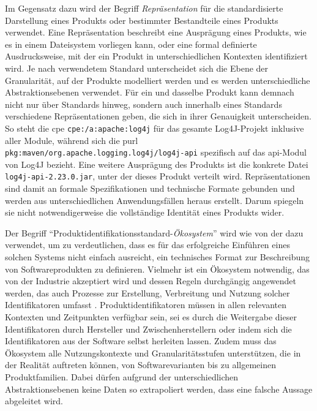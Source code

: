 Im Gegensatz dazu wird der Begriff \textit{Repräsentation} für die standardisierte Darstellung eines Produkts oder bestimmter Bestandteile eines Produkts verwendet.
Eine Repräsentation beschreibt eine Ausprägung eines Produkts, wie es in einem Dateisystem vorliegen kann, oder eine formal definierte Ausdrucksweise, mit der ein Produkt in unterschiedlichen Kontexten identifiziert wird.
Je nach verwendetem Standard unterscheidet sich die Ebene der Granularität, auf der Produkte modelliert werden und es werden unterschiedliche Abstraktionsebenen verwendet.
Für ein und dasselbe Produkt kann demnach nicht nur über Standards hinweg, sondern auch innerhalb eines Standards verschiedene Repräsentationen geben, die sich in ihrer Genauigkeit unterscheiden.
So steht die \acrshort{cpe} \texttt{cpe:/a:apache:log4j} für das gesamte Log4J-Projekt inklusive aller Module, während sich die \acrshort{purl} \texttt{pkg:maven/org.apache.logging.log4j/log4j-api} spezifisch auf das \acrshort{api}-Modul von Log4J bezieht.
Eine weitere Ausprägung des Produkts ist die konkrete Datei \texttt{log4j-api-2.23.0.jar}, unter der dieses Produkt verteilt wird.
Repräsentationen sind damit an formale Spezifikationen und technische Formate gebunden und werden aus unterschiedlichen Anwendungsfällen heraus erstellt.
Darum spiegeln sie nicht notwendigerweise die vollständige Identität eines Produkts wider.

Der Begriff \enquote{Produktidentifikationsstandard-\textit{Ökosystem}} wird wie von der \citeauthor{CISA2023} dazu verwendet, um zu verdeutlichen, dass es für das erfolgreiche Einführen eines solchen Systems nicht einfach ausreicht, ein technisches Format zur Beschreibung von Softwareprodukten zu definieren.
Vielmehr ist ein Ökosystem notwendig, das von der Industrie akzeptiert wird und dessen Regeln durchgängig angewendet werden, das auch Prozesse zur Erstellung, Verbreitung und Nutzung solcher Identifikatoren umfasst \autocite{CISA2023}.
Produktidentifikatoren müssen in allen relevanten Kontexten und Zeitpunkten verfügbar sein, sei es durch die Weitergabe dieser Identifikatoren durch Hersteller und Zwischenherstellern oder indem sich die Identifikatoren aus der Software selbst herleiten lassen.
Zudem muss das Ökosystem alle Nutzungskontexte und Granularitätsstufen unterstützen, die in der Realität auftreten können, von Softwarevarianten bis zu allgemeinen Produktfamilien.
Dabei dürfen aufgrund der unterschiedlichen Abstraktionsebenen keine Daten so extrapoliert werden, dass eine falsche Aussage abgeleitet wird.


